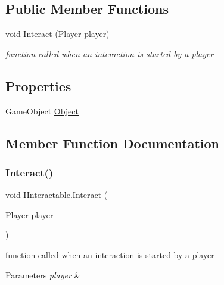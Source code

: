 \subsection*{Public Member Functions}
\begin{DoxyCompactItemize}
\item 
void \mbox{\hyperlink{interface_i_interactable_a736e28381ac0e7ca60f5fae2feb95afe}{Interact}} (\mbox{\hyperlink{class_player}{Player}} player)
\begin{DoxyCompactList}\small\item\em function called when an interaction is started by a player \end{DoxyCompactList}\end{DoxyCompactItemize}
\subsection*{Properties}
\begin{DoxyCompactItemize}
\item 
Game\+Object \mbox{\hyperlink{interface_i_interactable_a1ea155218acad8d933577fa071de48af}{Object}}
\end{DoxyCompactItemize}


\subsection{Member Function Documentation}
\mbox{\label{interface_i_interactable_a736e28381ac0e7ca60f5fae2feb95afe}} 
\subsubsection{\texorpdfstring{Interact()}{Interact()}}
{\footnotesize\ttfamily void I\+Interactable.\+Interact (\begin{DoxyParamCaption}\item[{\mbox{\hyperlink{class_player}{Player}}}]{player }\end{DoxyParamCaption})}



function called when an interaction is started by a player 


\begin{DoxyParams}{Parameters}
{\em player} & \\
\hline
\end{DoxyParams}


